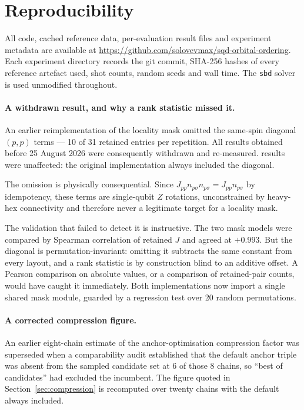 \documentclass[11pt,a4paper]{article}
\begin{document}
\FloatBarrier
\section*{Reproducibility}

All code, cached reference data, per-evaluation result files and experiment
metadata are available at
\url{https://github.com/solovevmax/sqd-orbital-ordering}. Each experiment
directory records the git commit, SHA-256 hashes of every reference artefact
used, shot counts, random seeds and wall time. The \texttt{sbd} solver is used
unmodified throughout.

\paragraph{A withdrawn result, and why a rank statistic missed it.}
An earlier reimplementation of the locality mask omitted the same-spin
diagonal $(p,p)$ terms --- 10 of 31 retained entries per repetition. All
 results obtained before 25 August 2026 were consequently withdrawn
and re-measured.  results were unaffected: the original implementation
always included the diagonal.

The omission is physically consequential. Since
$J_{pp}n_{p\sigma}n_{p\sigma} = J_{pp}n_{p\sigma}$ by idempotency, these
terms are single-qubit $Z$ rotations, unconstrained by heavy-hex connectivity
and therefore never a legitimate target for a locality mask.

The validation that failed to detect it is instructive. The two mask models
were compared by Spearman correlation of retained $J$ and agreed at $+0.993$.
But the diagonal is permutation-invariant: omitting it subtracts the same
constant from every layout, and a rank statistic is by construction blind to
an additive offset. A Pearson comparison on absolute values, or a comparison
of retained-pair counts, would have caught it immediately. Both
implementations now import a single shared mask module, guarded by a
regression test over 20 random permutations.

\paragraph{A corrected compression figure.} An earlier eight-chain estimate of
the anchor-optimisation compression factor was superseded when a
comparability audit established that the default anchor triple was absent
from the sampled candidate set at 6 of those 8 chains, so ``best of
candidates'' had excluded the incumbent. The figure quoted in
Section~\ref{sec:compression} is recomputed over twenty chains with the
default always included.
\end{document}
